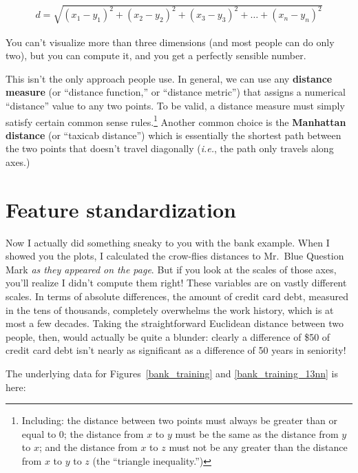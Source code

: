 \vspace{-.15in}
\begin{align*}
d = \sqrt{(x_1-y_1)^2 + (x_2-y_2)^2 + (x_3-y_3)^2 + \dots + (x_n-y_n)^2}
\end{align*}
\vspace{-.15in}

You can't visualize more than three dimensions (and most people can do only
two), but you can compute it, and you get a perfectly sensible number.

This isn't the only approach people use. In general, we can use any
\textbf{distance measure} (or ``distance function,'' or ``distance metric'')
that assigns a numerical ``distance'' value to any two points. To be valid, a
distance measure must simply satisfy certain common sense
rules.\footnote{Including: the distance between two points must always be
greater than or equal to 0; the distance from $x$ to $y$ must be the same as
the distance from $y$ to $x$; and the distance from $x$ to $z$ must not be any
greater than the distance from $x$ to $y$ to $z$ (the ``triangle
inequality.'')} Another common choice is the \textbf{Manhattan distance} (or
``taxicab distance'') which is essentially the shortest path between the two
points that doesn't travel diagonally (\textit{i.e.}, the path only travels
along axes.)

\section{Feature standardization}

Now I actually did something sneaky to you with the bank example. When I showed
you the plots, I calculated the crow-flies distances to Mr.~Blue Question Mark
\textit{as they appeared on the page}. But if you look at the scales of those
axes, you'll realize I didn't compute them right! These variables are on vastly
different scales. In terms of absolute differences, the amount of credit card
debt, measured in the tens of thousands, completely overwhelms the work
history, which is at most a few decades. Taking the straightforward Euclidean
distance between two people, then, would actually be quite a blunder: clearly a
difference of \$50 of credit card debt isn't nearly as significant as a
difference of 50 years in seniority!

The underlying data for Figures~\ref{bank_training} and
\ref{bank_training_13nn} is here:

